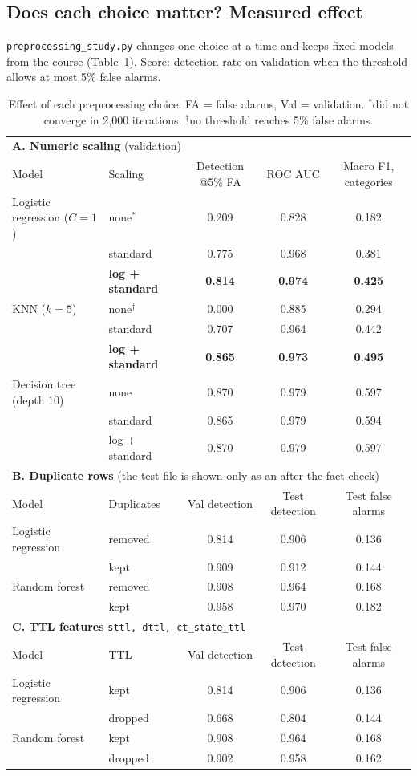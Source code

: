 \documentclass[11pt,a4paper]{article}
\begin{document}
\subsection{Does each choice matter? Measured effect}
\texttt{preprocessing\_study.py} changes one choice at a time and keeps fixed models from the course
(Table~\ref{tab:study}). Score: detection rate on validation when the threshold allows at most 5\%
false alarms.

\begin{table}[h]
\centering\small
\begin{tabular}{llccc}
\toprule
\multicolumn{5}{l}{\textbf{A. Numeric scaling} (validation)} \\
Model & Scaling & Detection @5\% FA & ROC AUC & Macro F1, categories \\
\midrule
Logistic regression ($C{=}1$) & none$^{*}$ & 0.209 & 0.828 & 0.182 \\
 & standard & 0.775 & 0.968 & 0.381 \\
 & \textbf{log + standard} & \textbf{0.814} & \textbf{0.974} & \textbf{0.425} \\
KNN ($k{=}5$) & none$^{\dagger}$ & 0.000 & 0.885 & 0.294 \\
 & standard & 0.707 & 0.964 & 0.442 \\
 & \textbf{log + standard} & \textbf{0.865} & \textbf{0.973} & \textbf{0.495} \\
Decision tree (depth 10) & none & 0.870 & 0.979 & 0.597 \\
 & standard & 0.865 & 0.979 & 0.594 \\
 & log + standard & 0.870 & 0.979 & 0.597 \\
\midrule
\multicolumn{5}{l}{\textbf{B. Duplicate rows} (the test file is shown only as an after-the-fact check)} \\
Model & Duplicates & Val detection & Test detection & Test false alarms \\
\midrule
Logistic regression & removed & 0.814 & 0.906 & 0.136 \\
 & kept & 0.909 & 0.912 & 0.144 \\
Random forest & removed & 0.908 & 0.964 & 0.168 \\
 & kept & 0.958 & 0.970 & 0.182 \\
\midrule
\multicolumn{5}{l}{\textbf{C. TTL features} \texttt{sttl, dttl, ct\_state\_ttl}} \\
Model & TTL & Val detection & Test detection & Test false alarms \\
\midrule
Logistic regression & kept & 0.814 & 0.906 & 0.136 \\
 & dropped & 0.668 & 0.804 & 0.144 \\
Random forest & kept & 0.908 & 0.964 & 0.168 \\
 & dropped & 0.902 & 0.958 & 0.162 \\
\bottomrule
\end{tabular}
\caption{Effect of each preprocessing choice. FA = false alarms, Val = validation. $^{*}$did not converge in 2{,}000 iterations. $^{\dagger}$no threshold reaches 5\% false alarms.}
\label{tab:study}
\end{table}
\end{document}

